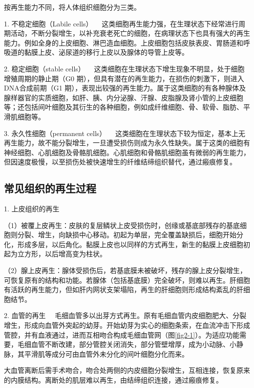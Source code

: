按再生能力不同，将人体组织细胞分为三类。

{1. 不稳定细胞（Labile cells）}
　这类细胞再生能力强，在生理状态下经常进行周期活动，不断分裂增生，以补充衰老死亡的细胞，在病理状态下也具有强大的再生能力。例如全身的上皮细胞、淋巴造血细胞。上皮细胞包括皮肤表皮、胃肠道和呼吸道的黏膜上皮、泌尿道的移行上皮以及腺体的导管上皮等。

{2. 稳定细胞（stable cells）}
　这类细胞在生理状态下增生现象不明显，处于细胞增殖周期的静止期（G{0}
期），但具有潜在的再生能力，在损伤的刺激下，则进入DNA合成前期（G{1}
期），表现出较强的再生能力。属于这类细胞的有各种腺体及腺样器官的实质细胞，如肝、胰、内分泌腺、汗腺、皮脂腺及肾小管的上皮细胞等；还包括间叶细胞及其衍生的各种细胞，例如成纤维细胞、骨、软骨、脂肪、平滑肌细胞等。

{3. 永久性细胞（permanent cells）}
　这类细胞在生理状态下较为恒定，基本上无再生能力，故不能分裂增生，一旦遭受损伤则成为永久性缺失。属于这类的细胞有神经细胞、心肌细胞及骨骼肌细胞。心肌细胞和骨骼肌细胞虽有微弱的再生能力，但因速度极慢，以至损伤处被快速增生的纤维结缔组织替代，通过瘢痕修复。

\subsection{常见组织的再生过程}

{1. 上皮组织的再生}

（1）被覆上皮再生：皮肤的复层鳞状上皮受损伤时，创缘或基底部残存的基底细胞则分裂、增生，向缺损中心移动。初起为单层，完全覆盖缺损后，细胞开始分化，形成多层，以后角化。黏膜上皮也以同样的方式再生，新生的黏膜上皮细胞初起为立方形，以后增高变为柱状。

（2）腺上皮再生：腺体受损伤后，若基底膜未被破坏，残存的腺上皮分裂增生，可恢复原有的结构和功能。若腺体（包括基底膜）完全破坏，则难以再生。肝细胞有活跃的再生能力，但如肝内网状支架塌陷，再生的肝细胞则形成结构紊乱的肝细胞结节。

{2. 血管的再生}
　毛细血管多以出芽方式再生。原有毛细血管内皮细胞肥大、分裂增生，形成向血管外突起的幼芽。开始幼芽为实心的细胞条索，在血流冲击下形成管腔，并有血液通过，进而互相吻合构成毛细血管网（图\ref{fig2-1}）。为适应功能需要，毛细血管不断改建，部分管腔关闭消失，部分管壁增厚，成为小动脉、小静脉，其平滑肌等成分可由血管外未分化的间叶细胞分化而来。

大血管离断后需手术吻合，吻合处两侧的内皮细胞分裂增生，互相连接，恢复原来的内膜结构。离断处的肌层难以再生，由结缔组织连接，通过瘢痕修复。

